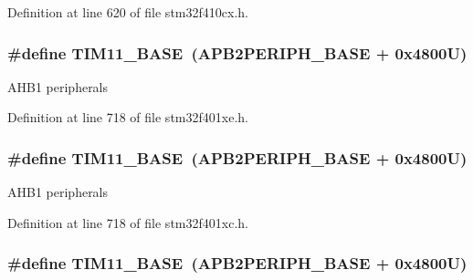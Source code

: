 Definition at line 620 of file stm32f410cx.\+h.

\subsubsection[{\texorpdfstring{T\+I\+M11\+\_\+\+B\+A\+SE}{TIM11_BASE}}]{\setlength{\rightskip}{0pt plus 5cm}\#define T\+I\+M11\+\_\+\+B\+A\+SE~({\bf A\+P\+B2\+P\+E\+R\+I\+P\+H\+\_\+\+B\+A\+SE} + 0x4800\+U)}\hypertarget{group___peripheral__registers__structures_ga3a4a06bb84c703084f0509e105ffaf1d}{}\label{group___peripheral__registers__structures_ga3a4a06bb84c703084f0509e105ffaf1d}
A\+H\+B1 peripherals 

Definition at line 718 of file stm32f401xe.\+h.

\subsubsection[{\texorpdfstring{T\+I\+M11\+\_\+\+B\+A\+SE}{TIM11_BASE}}]{\setlength{\rightskip}{0pt plus 5cm}\#define T\+I\+M11\+\_\+\+B\+A\+SE~({\bf A\+P\+B2\+P\+E\+R\+I\+P\+H\+\_\+\+B\+A\+SE} + 0x4800\+U)}\hypertarget{group___peripheral__registers__structures_ga3a4a06bb84c703084f0509e105ffaf1d}{}\label{group___peripheral__registers__structures_ga3a4a06bb84c703084f0509e105ffaf1d}
A\+H\+B1 peripherals 

Definition at line 718 of file stm32f401xc.\+h.

\subsubsection[{\texorpdfstring{T\+I\+M11\+\_\+\+B\+A\+SE}{TIM11_BASE}}]{\setlength{\rightskip}{0pt plus 5cm}\#define T\+I\+M11\+\_\+\+B\+A\+SE~({\bf A\+P\+B2\+P\+E\+R\+I\+P\+H\+\_\+\+B\+A\+SE} + 0x4800\+U)}\hypertarget{group___peripheral__registers__structures_ga3a4a06bb84c703084f0509e105ffaf1d}{}\label{group___peripheral__registers__structures_ga3a4a06bb84c703084f0509e105ffaf1d}


